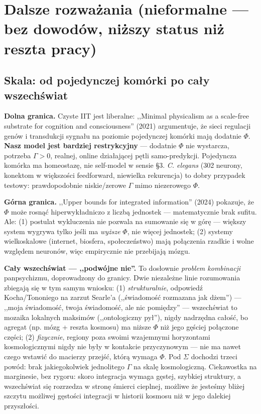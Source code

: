\documentclass[11pt]{article}
\begin{document}
\section{Dalsze rozważania (nieformalne --- bez dowodów, niższy status niż reszta pracy)}

\subsection*{Skala: od pojedynczej komórki po cały wszechświat}

\textbf{Dolna granica.} Czyste IIT jest liberalne: ,,Minimal physicalism as a scale-free substrate for cognition and consciousness'' (2021) argumentuje, że sieci regulacji genów i transdukcji sygnału na poziomie pojedynczej komórki mają dodatnie $\Phi$. \textbf{Nasz model jest bardziej restrykcyjny} --- dodatnie $\Phi$ nie wystarcza, potrzeba $\Gamma>0$, realnej, online działającej pętli samo-predykcji. Pojedyncza komórka ma homeostazę, nie self-model w sensie \S3. \emph{C. elegans} (302 neurony, konektom w większości feedforward, niewielka rekurencja) to dobry przypadek testowy: prawdopodobnie niskie/zerowe $\Gamma$ mimo niezerowego $\Phi$.

\textbf{Górna granica.} ,,Upper bounds for integrated information'' (2024) pokazuje, że $\Phi$ może rosnąć hiperwykładniczo z liczbą jednostek --- matematycznie brak sufitu. Ale: (1) postulat wykluczenia nie pozwala na sumowanie się w górę --- większy system wygrywa tylko jeśli ma \emph{wyższe} $\Phi$, nie więcej jednostek; (2) systemy wielkoskalowe (internet, biosfera, społeczeństwo) mają połączenia rzadkie i wolne względem neuronów, więc empirycznie nie przebijają mózgu.

\textbf{Cały wszechświat --- ,,podwójne nie''.} To dosłownie \emph{problem kombinacji} panpsychizmu, doprowadzony do granicy. Dwie niezależne linie rozumowania zbiegają się w tym samym wniosku: (1) \emph{strukturalnie}, odpowiedź Kocha/Tononiego na zarzut Searle'a (,,świadomość rozmazana jak dżem'') --- ,,moja świadomość, twoja świadomość, ale nic pomiędzy'' --- wszechświat to mozaika lokalnych maksimów (,,ontologiczny pył''), nigdy nadrzędna całość, bo agregat (np. mózg + reszta kosmosu) ma niższe $\Phi$ niż jego gęściej połączone części; (2) \emph{fizycznie}, regiony poza swoimi wzajemnymi horyzontami kosmologicznymi nigdy nie były w kontakcie przyczynowym --- nie ma nawet czego wstawić do macierzy przejść, którą wymaga $\Phi$. Pod $\Sigma$ dochodzi trzeci powód: brak jakiegokolwiek jednolitego $\Gamma$ na skalę kosmologiczną. Ciekawostka na marginesie, bez rygoru: skoro integracja wymaga gęstej, szybkiej struktury, a wszechświat się rozrzedza w stronę śmierci cieplnej, możliwe że jesteśmy bliżej szczytu możliwej gęstości integracji w historii kosmosu niż w jego dalekiej przyszłości.
\end{document}
